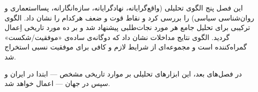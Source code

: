این فصل پنج الگوی تحلیلی (واقع‌گرایانه، نهادگرایانه، سازه‌انگارانه، پسااستعماری و روان‌شناسی سیاسی) را بررسی کرد و نقاط قوت و ضعف هرکدام را نشان داد. الگوی ترکیبی  برای تحلیل جامع هر مورد نجات‌طلبی پیشنهاد شد و بر ده مورد تاریخی اِعمال گردید. الگوی  نتایج مداخلات نشان داد که دوگانه‌ی ساده‌ی «موفقیت/شکست» گمراه‌کننده است و مجموعه‌ای از شرایط لازم و کافی برای موفقیت نسبی استخراج شد.

در فصل‌های بعد، این ابزارهای تحلیلی بر موارد تاریخی مشخص — ابتدا در ایران و سپس در جهان — اعمال خواهد شد.

\cleardoublepage
